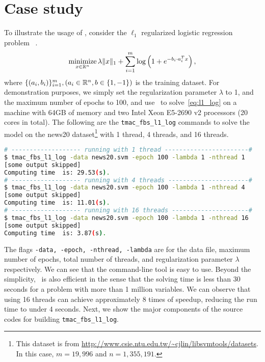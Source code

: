 \section{Case study}\label{sec:quick_start}
To illustrate the  usage of \pkg, consider the $\ell_1$ regularized logistic regression problem~\citep{ng2004feature} .
\begin{equation}\label{eq:l1_log}
\operatorname*{minimize}_{x \in \mathbb{R}^n} \lambda \|x\|_1 + \sum_{i = 1}^m \log\left(1 + e^{-b_i \cdot a_i^T x}\right),
\end{equation}
where $\{(a_i, b_i)\}_{i = 1}^m, (a_i \in \mathbb{R}^n, b \in \{1, -1\})$ is the training dataset. For demonstration purposes, we simply set the regularization parameter
$\lambda$ to 1, and the maximum number of epochs to 100, and use \pkg~to solve~\eqref{eq:l1_log} on a machine with 64GB of memory and two Intel Xeon E5-2690 v2 processors (20 cores in total). The following are the \texttt{tmac\_fbs\_l1\_log} commands to solve the model
on the news20 dataset\footnote{ This dataset is from \url{http://www.csie.ntu.edu.tw/~cjlin/libsvmtools/datasets}. In this case, $m=19,996$ and $n=1,355,191$. } with 1 thread, 4 threads, and 16 threads.
\begin{lstlisting}[language=bash]
# ------------------- running with 1 thread -----------------------#
$ tmac_fbs_l1_log -data news20.svm -epoch 100 -lambda 1 -nthread 1
[some output skipped]
Computing time  is: 29.53(s).
# ------------------- running with 4 threads ----------------------#
$ tmac_fbs_l1_log -data news20.svm -epoch 100 -lambda 1 -nthread 4
[some output skipped]
Computing time  is: 11.01(s).
# ------------------- running with 16 threads ---------------------#
$ tmac_fbs_l1_log -data news20.svm -epoch 100 -lambda 1 -nthread 16
[some output skipped]
Computing time  is: 3.87(s).
\end{lstlisting}
The flags \texttt{-data, -epoch, -nthread, -lambda} are  for the data file, maximum number of epochs,
total number of threads, and regularization parameter $\lambda$ respectively. We can see that the command-line
tool is easy to use. Beyond the simplicity, \pkg~is also efficient in the sense that the solving time is
less than 30 seconds for a problem with more than 1 million variables. We can observe that using 16 threads can achieve approximately 8 times of speedup, reducing the run time to under 4 seconds. Next, we show the major components of the source
codes for building \texttt{tmac\_fbs\_l1\_log}.


